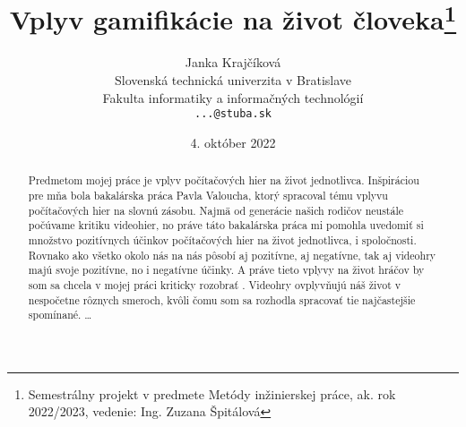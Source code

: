 \documentclass[10pt,twoside,slovak,coursepaper]{article}
\title{Vplyv gamifikácie na život človeka\thanks{Semestrálny projekt v predmete Metódy inžinierskej práce, ak. rok 2022/2023, vedenie: Ing. Zuzana Špitálová}}
\author{Janka Krajčíková\\[2pt]
	{\small Slovenská technická univerzita v Bratislave}\\
	{\small Fakulta informatiky a informačných technológií}\\
	{\small \texttt{...@stuba.sk}}
	}
\date{\small 4. október 2022}
\begin{document}
\maketitle

\begin{abstract}
Predmetom mojej práce je vplyv počítačových hier na život jednotlivca. Inšpiráciou pre mňa bola bakalárska práca Pavla Valoucha, ktorý spracoval tému vplyvu počítačových hier na slovnú zásobu. Najmä od generácie našich rodičov neustále počúvame kritiku videohier, no práve táto bakalárska práca mi pomohla uvedomiť si množstvo pozitívnych účinkov počítačových hier na život jednotlivca, i spoločnosti. Rovnako ako všetko okolo nás na nás pôsobí aj pozitívne, aj negatívne, tak aj videohry majú svoje pozitívne, no i negatívne účinky. A práve tieto vplyvy na život hráčov by som sa chcela v mojej práci kriticky rozobrať . Videohry ovplyvňujú náš život v nespočetne rôznych smeroch, kvôli čomu som sa rozhodla spracovať tie najčastejšie spomínané. 
\ldots
\end{abstract}

\section{}
\end{document}
